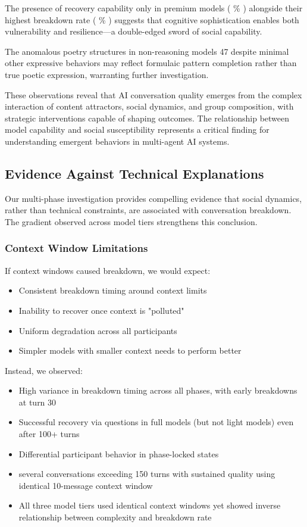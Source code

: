 \documentclass[11pt,letterpaper]{article}
\newcommand{\exponedataTotalSessionsRaw}{67}
\newcommand{\exponedataBreakdownSessionsRaw}{37}
\newcommand{\exponedataRecoverySessionsRaw}{9}
\newcommand{\exponedataBreakdownPercentage}{%
  \fpeval{round(\exponedataBreakdownSessionsRaw / \exponedataTotalSessionsRaw * 100, 1)}\%
}
\newcommand{\exponedataRecoveryPercentage}{%
  \fpeval{round(\exponedataRecoverySessionsRaw / \exponedataTotalSessionsRaw * 100, 1)}\%
}
\newcommand{\exponedataSustainedDialogueThreshold}{150}
\newcommand{\exponedataSustainedDialogueCount}{several}
\newcommand{\expthreePoetryStructures}{47}
\begin{document}
The presence of recovery capability only in premium models (\exponedataRecoveryPercentage{}) alongside their highest breakdown rate (\exponedataBreakdownPercentage{}) suggests that cognitive sophistication enables both vulnerability and resilience—a double-edged sword of social capability.

The anomalous poetry structures in non-reasoning models \expthreePoetryStructures{} despite minimal other expressive behaviors may reflect formulaic pattern completion rather than true poetic expression, warranting further investigation.

These observations reveal that AI conversation quality emerges from the complex interaction of content attractors, social dynamics, and group composition, with strategic interventions capable of shaping outcomes. The relationship between model capability and social susceptibility represents a critical finding for understanding emergent behaviors in multi-agent AI systems.


\subsection{Evidence Against Technical Explanations}

Our multi-phase investigation provides compelling evidence that social dynamics, rather than technical constraints, are associated with conversation breakdown. The gradient observed across model tiers strengthens this conclusion.

\subsubsection{Context Window Limitations}

If context windows caused breakdown, we would expect:
\begin{itemize}
    \item Consistent breakdown timing around context limits
    \item Inability to recover once context is "polluted"
    \item Uniform degradation across all participants
    \item Simpler models with smaller context needs to perform better
\end{itemize}

Instead, we observed:
\begin{itemize}
    \item High variance in breakdown timing across all phases, with early breakdowns at turn 30
    \item Successful recovery via questions in full models (but not light models) even after 100+ turns
    \item Differential participant behavior in phase-locked states
    \item \exponedataSustainedDialogueCount{} conversations exceeding \exponedataSustainedDialogueThreshold{} turns with sustained quality using identical 10-message context window
    \item All three model tiers used identical context windows yet showed inverse relationship between complexity and breakdown rate
\end{itemize}
\end{document}

